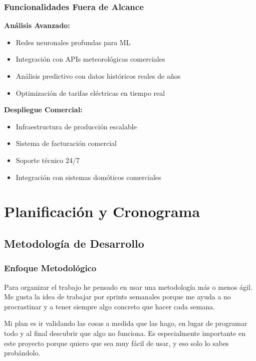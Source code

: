 \documentclass[12pt,a4paper,spanish]{article}
\begin{document}
\subsubsection{Funcionalidades Fuera de Alcance}

\textbf{Análisis Avanzado:}
\begin{itemize}
    \item Redes neuronales profundas para ML
    \item Integración con APIs meteorológicas comerciales
    \item Análisis predictivo con datos históricos reales de años
    \item Optimización de tarifas eléctricas en tiempo real
\end{itemize}

\textbf{Despliegue Comercial:}
\begin{itemize}
    \item Infraestructura de producción escalable
    \item Sistema de facturación comercial
    \item Soporte técnico 24/7
    \item Integración con sistemas domóticos comerciales
\end{itemize}

\section{Planificación y Cronograma}

\subsection{Metodología de Desarrollo}

\subsubsection{Enfoque Metodológico}

Para organizar el trabajo he pensado en usar una metodología más o menos ágil. Me gusta la idea de trabajar por sprints semanales porque me ayuda a no procrastinar y a tener siempre algo concreto que hacer cada semana.

Mi plan es ir validando las cosas a medida que las hago, en lugar de programar todo y al final descubrir que algo no funciona. Es especialmente importante en este proyecto porque quiero que sea muy fácil de usar, y eso solo lo sabes probándolo.
\end{document}
